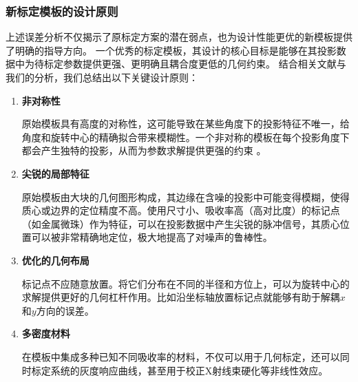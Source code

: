 \subsubsection{新标定模板的设计原则}
上述误差分析不仅揭示了原标定方案的潜在弱点，也为设计性能更优的新模板提供了明确的指导方向。
一个优秀的标定模板，其设计的核心目标是能够在其投影数据中为待标定参数提供更强、更明确且耦合度更低的几何约束。
结合相关文献与我们的分析，我们总结出以下关键设计原则：
\begin{enumerate}[label=(\arabic*), left=0.5em]
    \item \textbf{非对称性} \par 
    原始模板具有高度的对称性，这可能导致在某些角度下的投影特征不唯一，给角度和旋转中心的精确拟合带来模糊性。一个非对称的模板在每个投影角度下都会产生独特的投影，从而为参数求解提供更强的约束 。  
    \item \textbf{尖锐的局部特征} \par
    原始模板由大块的几何图形构成，其边缘在含噪的投影中可能变得模糊，使得质心或边界的定位精度不高。使用尺寸小、吸收率高（高对比度）的标记点（如金属微珠）作为特征，可以在投影数据中产生尖锐的脉冲信号，其质心位置可以被非常精确地定位，极大地提高了对噪声的鲁棒性。  
    \item \textbf{优化的几何布局} \par
    标记点不应随意放置。将它们分布在不同的半径和方位上，可以为旋转中心的求解提供更好的几何杠杆作用。比如沿坐标轴放置标记点就能够有助于解耦$x$和$y$方向的误差。  
    \item \textbf{多密度材料} \par
    在模板中集成多种已知不同吸收率的材料，不仅可以用于几何标定，还可以同时标定系统的灰度响应曲线，甚至用于校正X射线束硬化等非线性效应。
\end{enumerate}





